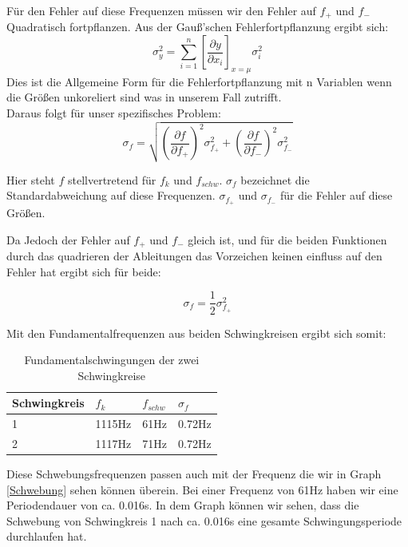 \documentclass[twoside]{protokoll}
\begin{document}
Für den Fehler auf diese Frequenzen müssen wir den Fehler auf $f_+$ und $f_-$ Quadratisch fortpflanzen. Aus der Gauß'schen Fehlerfortpflanzung ergibt sich:
\begin{equation}
	\sigma_y^2 = \sum_{i=1}^n\left[\frac{\partial y}{\partial x_i}\right]_{x=\mu}\sigma_{i}^2
\label{Fehlerfortpflanzung}
\end{equation}
Dies ist die Allgemeine Form für die Fehlerfortpflanzung mit n Variablen wenn die Größen unkoreliert sind was in unserem Fall zutrifft.\\
Daraus folgt für unser spezifisches Problem:
\begin{equation}
\sigma_f =\sqrt{ \left(\frac{\partial f}{\partial f_+}\right)^2\sigma_{f_+}^2 + \left(\frac{\partial f}{\partial f_-}\right)^2\sigma_{f_-}^2}
\end{equation}

Hier steht $f$ stellvertretend für $f_k$ und $f_{schw}$. $\sigma_f$ bezeichnet die Standardabweichung auf diese Frequenzen. 
$ \sigma_{f_+} $ und $ \sigma_{f_-}$ für die Fehler auf diese Größen.

Da Jedoch der Fehler auf $f_+$ und $f_-$ gleich ist, und für die beiden Funktionen durch das quadrieren der Ableitungen das Vorzeichen keinen einfluss auf den Fehler hat ergibt sich für beide:

\begin{equation}
\sigma_f = \frac{1}{2}\sigma_{f_+}^2
\end{equation}

Mit den Fundamentalfrequenzen aus beiden Schwingkreisen ergibt sich somit:

\begin{table}[H]
    \centering
    \begin{tabularx}{1\textwidth}{X X X X} %
        \toprule
        \textbf{Schwingkreis} & \textbf{$f_k$} & \textbf{$f_{schw}$} & \textbf{$\sigma_f$} \\
        \midrule
        1 & 1115Hz & 61Hz & 0.72Hz\\
        2 & 1117Hz & 71Hz & 0.72Hz \\
        \bottomrule
    \end{tabularx}
    \caption{Fundamentalschwingungen der zwei Schwingkreise}
    \label{•}
\end{table} 

Diese Schwebungsfrequenzen passen auch mit der Frequenz die wir in Graph \ref{Schwebung} sehen können überein. 
Bei einer Frequenz von 61Hz haben wir eine Periodendauer von ca. 0.016s. 
In dem Graph können wir sehen, dass die Schwebung von Schwingkreis 1 nach ca. 0.016s eine gesamte Schwingungsperiode durchlaufen hat.
\end{document}
